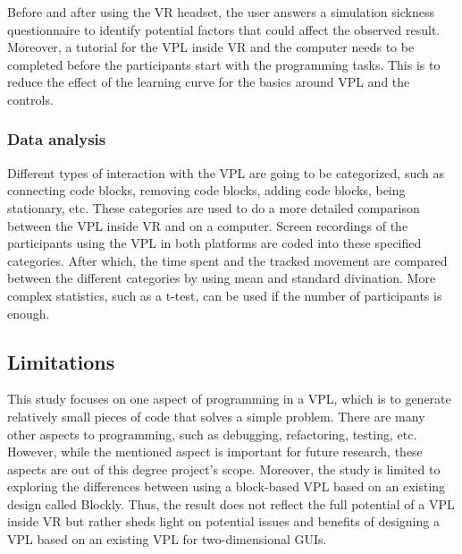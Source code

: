 \documentclass{sigchi}
\begin{document}
Before and after using the VR headset, the user answers a simulation sickness questionnaire to identify potential factors that could affect the observed result. Moreover, a tutorial for the VPL inside VR and the computer needs to be completed before the participants start with the programming tasks. This is to reduce the effect of the learning curve for the basics around VPL and the controls.

\subsubsection{Data analysis}
Different types of interaction with the VPL are going to be categorized, such as connecting code blocks, removing code blocks, adding code blocks, being stationary, etc. These categories are used to do a more detailed comparison between the VPL inside VR and on a computer. Screen recordings of the participants using the VPL in both platforms are coded into these specified categories. After which, the time spent and the tracked movement are compared between the different categories by using mean and standard divination. More complex statistics, such as a t-test, can be used if the number of participants is enough.


\subsection{Limitations}
This study focuses on one aspect of programming in a VPL, which is to generate relatively small pieces of code that solves a simple problem. There are many other aspects to programming, such as debugging, refactoring, testing, etc. However, while the mentioned aspect is important for future research, these aspects are out of this degree project's scope. Moreover, the study is limited to exploring the differences between using a block-based VPL based on an existing design called Blockly. Thus, the result does not reflect the full potential of a VPL inside VR but rather sheds light on potential issues and benefits of designing a VPL based on an existing VPL for two-dimensional GUIs.
\end{document}
